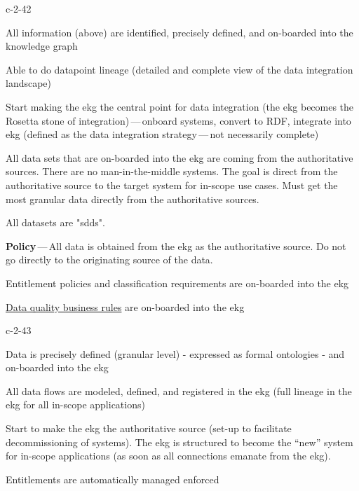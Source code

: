 \begin{level-assessment}{c-2-4}{2}

    \item All information (above) are identified, precisely defined, and on-boarded into the knowledge graph
    \item Able to do datapoint lineage (detailed and complete view of the data integration landscape)
    \item Start making the \gls{ekg} the central point for data integration (the \gls{ekg} becomes the Rosetta stone of
          integration)\,---\,onboard systems, convert to RDF, integrate into \gls{ekg} (defined as the
          data integration strategy\,---\,not necessarily complete)
    \item All data sets that are on-boarded into the \gls{ekg} are coming from the authoritative sources.
          There are no man-in-the-middle systems.
          The goal is direct from the authoritative source to the target system for in-scope use cases.
          Must get the most granular data directly from the authoritative sources.
    \item All datasets are "\glspl{sdd}".
    \item \textbf{Policy}\,---\,All data is obtained from the \gls{ekg} as the authoritative source.
          Do not go directly to the originating source of the data.
    \item Entitlement policies and classification requirements are on-boarded into the \gls{ekg}
    \item \hyperref[sec:ekg-maturity-data-quality-business-rules]{Data quality business rules}
          are on-boarded into the \gls{ekg}

\end{level-assessment}

\begin{level-assessment}{c-2-4}{3}

    \item Data is precisely defined (granular level) - expressed as formal ontologies - and on-boarded into the \gls{ekg}
    \item All data flows are modeled, defined, and registered in the \gls{ekg} (full lineage in the \gls{ekg} for all
          in-scope applications)
    \item Start to make the \gls{ekg} the authoritative source (set-up to facilitate decommissioning of systems).
          The \gls{ekg} is structured to become the “new” system for in-scope applications (as soon as all
          connections emanate from the \gls{ekg}).
    \item Entitlements are automatically managed enforced

\end{level-assessment}

